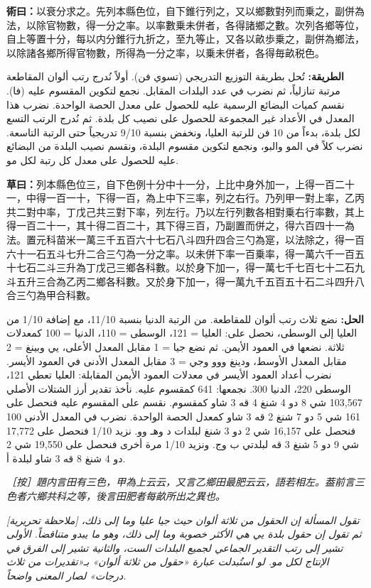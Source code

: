 \documentclass[11pt,a4paper]{article}
\newcommand{\working}[2]{\par\noindent%
  \begin{minipage}[t]{0.48\textwidth}\textbf{草曰：}#1\end{minipage}%
  \hfill%
  \begin{minipage}[t]{0.48\textwidth}\arabicfont\beginR\textbf{الحل:} #2\endR\end{minipage}\par\vspace{0.2cm}}
\newcommand{\method}[2]{\par\noindent%
  \begin{minipage}[t]{0.48\textwidth}\textbf{術曰：}#1\end{minipage}%
  \hfill%
  \begin{minipage}[t]{0.48\textwidth}\arabicfont\beginR\textbf{الطريقة:} #2\endR\end{minipage}\par\vspace{0.3cm}}
\newcommand{\ednote}[2]{\par\noindent%
  \begin{minipage}[t]{0.48\textwidth}\textit{\color{ednotecolor}［按］#1}\end{minipage}%
  \hfill%
  \begin{minipage}[t]{0.48\textwidth}\arabicfont\beginR\textit{\color{ednotecolor}[ملاحظة تحريرية] #2}\endR\end{minipage}\par\vspace{0.2cm}}
\begin{document}
\method{以衰分求之。先列本縣色位，自下錐行列之，又以鄉數對列而乗之，副併為法，以除官物數，得一分之率。以率數乗未併者，各得諸鄉之數。次列各鄉等位，自上等置十分，每以内分錐行九折之，至九等止，又各以畝歩乗之，副併為鄉法，以除諸各鄉所得官物數，所得為一分之率，以乗未併者，各得毎畝税色。}{تُحل بطريقة التوزيع التدريجي (تسوي فن). أولاً نُدرج رتب ألوان المقاطعة مرتبة تنازلياً، ثم نضرب في عدد البلدات المقابل. نجمع لتكوين المقسوم عليه (فا). نقسم كميات البضائع الرسمية عليه للحصول على معدل الحصة الواحدة. نضرب هذا المعدل في الأعداد غير المجموعة للحصول على نصيب كل بلدة. ثم نُدرج الرتب التسع لكل بلدة، بدءاً من 10 فن للرتبة العليا، ونخفض بنسبة 9/10 تدريجياً حتى الرتبة التاسعة. نضرب كلاً في المو والبو، ونجمع لتكوين مقسوم البلدة، ونقسم نصيب البلدة من البضائع عليه للحصول على معدل كل رتبة لكل مو.}

\working{列本縣色位三，自下色例十分中十一分，上比中身外加一，上得一百二十一，中得一百一十，下得一百，為上中下三率，列之右行。乃列甲一對上率，乙丙共二對中率，丁戊己共三對下率，列左行。乃以左行列數各相對乗右行率數，其上得一百二十一，其十得二百二十，其下得三百，乃副置而併之，得六百四十一為法。置元科苗米一萬三千五百六十七石八斗四升四合三勺為寔，以法除之，得一百六十一石五斗七升二合三勺為一分之率。以未併下率一百乗率，得一萬六千一百五十七石二斗三升為丁戊己三鄉各科數。以於身下加一，得一萬七千七百七十二石九斗五升三合為乙丙二鄉各科數。又於身下加一，得一萬九千五百五十石二斗四升八合三勺為甲合科數。}{نضع ثلاث رتب ألوان للمقاطعة. من الرتبة الدنيا بنسبة 11/10، مع إضافة 1/10 من العليا إلى الوسطى، نحصل على: العليا = 121، الوسطى = 110، الدنيا = 100 كمعدلات ثلاثة. نضعها في العمود الأيمن. ثم نضع جيا = 1 مقابل المعدل الأعلى، يي وبينغ = 2 مقابل المعدل الأوسط، ودينغ ووو وجي = 3 مقابل المعدل الأدنى في العمود الأيسر. نضرب أعداد العمود الأيسر في معدلات العمود الأيمن المقابلة: العليا تعطي 121، الوسطى 220، الدنيا 300. نجمعها: 641 كمقسوم عليه. نأخذ تقدير أرز الشتلات الأصلي 103,567 شي 8 دو 4 شنغ 4 قه 3 شاو كمقسوم. نقسم على المقسوم عليه فنحصل على 161 شي 5 دو 7 شنغ 2 قه 3 شاو كمعدل الحصة الواحدة. نضرب في المعدل الأدنى 100 فنحصل على 16,157 شي 2 دو 3 شنغ لبلدات د وهـ وو. نزيد 1/10 فنحصل على 17,772 شي 9 دو 5 شنغ 3 قه لبلدتي ب وج. ونزيد 1/10 مرة أخرى فنحصل على 19,550 شي 2 دو 4 شنغ 8 قه 3 شاو لبلدة أ.}

\ednote{題内言田有三色，甲為上云云，又言乙鄉田最肥云云，語若相左。葢前言三色者六鄉共科之等，後言田肥者每畝所出之異也。}{تقول المسألة إن الحقول من ثلاثة ألوان حيث جيا عليا وما إلى ذلك، ثم تقول إن حقول بلدة يي هي الأكثر خصوبة وما إلى ذلك، وهو ما يبدو متناقضاً. الأولى تشير إلى رتب التقدير الجماعي لجميع البلدات الست، والثانية تشير إلى الفرق في الإنتاج لكل مو. لو استُبدلت عبارة «حقول من ثلاثة ألوان» بـ«تقديرات من ثلاث درجات» لصار المعنى واضحاً.}
\end{document}
